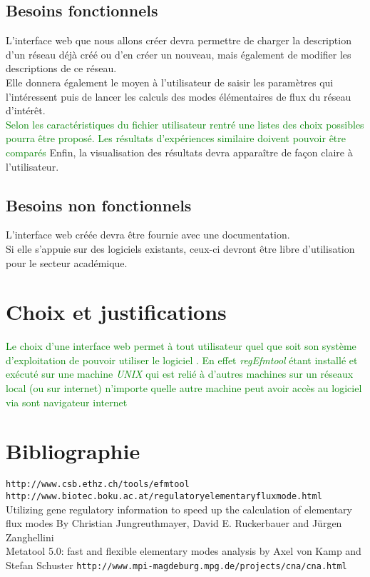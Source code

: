 \documentclass[12pt,a4paper]{report}
\begin{document}
\section{Besoins fonctionnels}

\noindent L'interface web que nous allons créer devra permettre de charger la description d'un réseau déjà créé ou d'en créer un nouveau, mais également de modifier les descriptions de ce réseau.\\
Elle donnera également le moyen à l'utilisateur de saisir les paramètres qui l'intéressent puis de lancer les calculs des modes élémentaires de flux du réseau d'intérêt.\\
\textcolor{green}{Selon les caractéristiques du fichier utilisateur rentré une listes des choix possibles pourra être proposé. Les résultats d'expériences similaire doivent pouvoir être comparés}
Enfin, la visualisation des résultats devra apparaître de façon claire à l'utilisateur.


\section{Besoins non fonctionnels}

\noindent L'interface web créée devra être fournie avec une documentation.\\
Si elle s'appuie sur des logiciels existants, ceux-ci devront être libre d'utilisation pour le secteur académique.

\chapter{Choix et justifications}
\noindent \textcolor{green}{Le choix d'une interface web permet à tout utilisateur quel que soit son système d'exploitation de pouvoir utiliser le logiciel . 
En effet \emph{regEfmtool} étant installé et exécuté sur une machine \emph{UNIX} qui est relié à d'autres machines sur un réseaux local (ou sur internet) n'importe quelle autre machine peut avoir accès au logiciel via sont navigateur internet}
\chapter*{Bibliographie}

\texttt{http://www.csb.ethz.ch/tools/efmtool}\\
\texttt{http://www.biotec.boku.ac.at/regulatoryelementaryfluxmode.html}\\
Utilizing gene regulatory information to speed up the calculation of elementary flux modes By Christian Jungreuthmayer, David E. Ruckerbauer and Jürgen Zanghellini\\
Metatool 5.0: fast and flexible elementary modes analysis by Axel von Kamp and Stefan Schuster
\texttt{http://www.mpi-magdeburg.mpg.de/projects/cna/cna.html}

\end{document}
